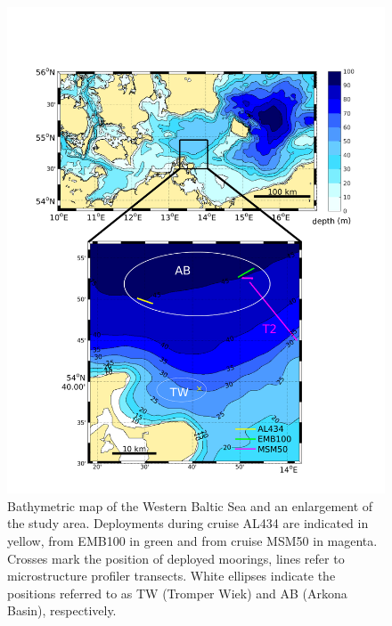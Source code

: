  \begin{figure}[ht]
 \centering
\includegraphics[width=16cm]{bilder/studyarea.pdf}
 \caption{Bathymetric map of the Western Baltic Sea and an enlargement of the 
study area. Deployments during cruise AL434 are indicated in yellow, from 
EMB100 in green and from cruise MSM50 in magenta. Crosses mark the 
position of deployed moorings, lines refer to microstructure profiler 
transects. White ellipses indicate the positions referred to as TW (Tromper 
Wiek) and AB (Arkona Basin), respectively.}
 \label{studyarea}
 \end{figure}
 
